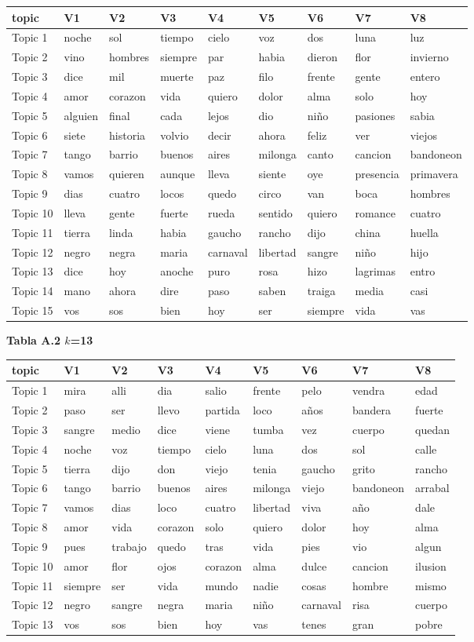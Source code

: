\documentclass[]{article}
\begin{document}
\begin{longtable}[]{@{}lllllllll@{}}
\toprule
topic & V1 & V2 & V3 & V4 & V5 & V6 & V7 & V8\tabularnewline
\midrule
\endhead
Topic 1 & noche & sol & tiempo & cielo & voz & dos & luna &
luz\tabularnewline
Topic 2 & vino & hombres & siempre & par & habia & dieron & flor &
invierno\tabularnewline
Topic 3 & dice & mil & muerte & paz & filo & frente & gente &
entero\tabularnewline
Topic 4 & amor & corazon & vida & quiero & dolor & alma & solo &
hoy\tabularnewline
Topic 5 & alguien & final & cada & lejos & dio & niño & pasiones &
sabia\tabularnewline
Topic 6 & siete & historia & volvio & decir & ahora & feliz & ver &
viejos\tabularnewline
Topic 7 & tango & barrio & buenos & aires & milonga & canto & cancion &
bandoneon\tabularnewline
Topic 8 & vamos & quieren & aunque & lleva & siente & oye & presencia &
primavera\tabularnewline
Topic 9 & dias & cuatro & locos & quedo & circo & van & boca &
hombres\tabularnewline
Topic 10 & lleva & gente & fuerte & rueda & sentido & quiero & romance &
cuatro\tabularnewline
Topic 11 & tierra & linda & habia & gaucho & rancho & dijo & china &
huella\tabularnewline
Topic 12 & negro & negra & maria & carnaval & libertad & sangre & niño &
hijo\tabularnewline
Topic 13 & dice & hoy & anoche & puro & rosa & hizo & lagrimas &
entro\tabularnewline
Topic 14 & mano & ahora & dire & paso & saben & traiga & media &
casi\tabularnewline
Topic 15 & vos & sos & bien & hoy & ser & siempre & vida &
vas\tabularnewline
\bottomrule
\end{longtable}

\textbf{Tabla A.2 \(k\)=13}

\begin{longtable}[]{@{}lllllllll@{}}
\toprule
topic & V1 & V2 & V3 & V4 & V5 & V6 & V7 & V8\tabularnewline
\midrule
\endhead
Topic 1 & mira & alli & dia & salio & frente & pelo & vendra &
edad\tabularnewline
Topic 2 & paso & ser & llevo & partida & loco & años & bandera &
fuerte\tabularnewline
Topic 3 & sangre & medio & dice & viene & tumba & vez & cuerpo &
quedan\tabularnewline
Topic 4 & noche & voz & tiempo & cielo & luna & dos & sol &
calle\tabularnewline
Topic 5 & tierra & dijo & don & viejo & tenia & gaucho & grito &
rancho\tabularnewline
Topic 6 & tango & barrio & buenos & aires & milonga & viejo & bandoneon
& arrabal\tabularnewline
Topic 7 & vamos & dias & loco & cuatro & libertad & viva & año &
dale\tabularnewline
Topic 8 & amor & vida & corazon & solo & quiero & dolor & hoy &
alma\tabularnewline
Topic 9 & pues & trabajo & quedo & tras & vida & pies & vio &
algun\tabularnewline
Topic 10 & amor & flor & ojos & corazon & alma & dulce & cancion &
ilusion\tabularnewline
Topic 11 & siempre & ser & vida & mundo & nadie & cosas & hombre &
mismo\tabularnewline
Topic 12 & negro & sangre & negra & maria & niño & carnaval & risa &
cuerpo\tabularnewline
Topic 13 & vos & sos & bien & hoy & vas & tenes & gran &
pobre\tabularnewline
\bottomrule
\end{longtable}
\end{document}

